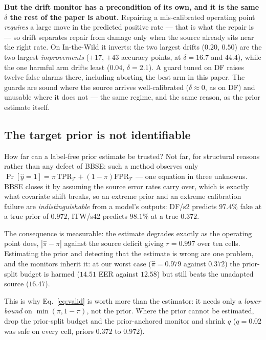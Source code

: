 \documentclass[conference]{IEEEtran}
\begin{document}
\textbf{But the drift monitor has a precondition of its own, and it is the same
$\delta$ the rest of the paper is about.} Repairing a mis-calibrated operating point \emph{requires} a large move in the
predicted positive rate --- that is what the repair is --- so drift separates
repair from damage only when the source already sits near the right rate. On
In-the-Wild it inverts: the two largest drifts ($0.20$, $0.50$) are the two
largest \emph{improvements} ($+17$, $+43$ accuracy points, at $\delta{=}16.7$ and
$44.4$), while the one harmful arm drifts least ($0.04$, $\delta{=}2.1$). A guard tuned on DF raises twelve false alarms there, including aborting the
best arm in this paper. The guards are sound where the source arrives well-calibrated
($\delta\!\approx\!0$, as on DF) and unusable where it does not --- the same
regime, and the same reason, as the prior estimate itself.

\subsection{The target prior is not identifiable}
How far can a label-free prior estimate be trusted? Not far, for structural
reasons rather than any defect of BBSE: such a method observes only
$\Pr[\hat y{=}1]=\pi\,\mathrm{TPR}_{\mathcal T}+(1{-}\pi)\mathrm{FPR}_{\mathcal T}$
--- one equation in three unknowns. BBSE closes it by assuming the source error
rates carry over, which is exactly what covariate shift breaks, so an extreme
prior and an extreme calibration failure are \emph{indistinguishable} from a
model's outputs: DF/s2 predicts $97.4\%$ fake at a true prior of $0.972$,
ITW/s42 predicts $98.1\%$ at a true $0.372$.

The consequence is measurable: the estimate degrades exactly as the operating
point does, $|\hat\pi-\pi|$ against the source deficit giving $r{=}0.997$ over ten
cells. Estimating the prior and detecting that the estimate is wrong are one problem,
and the monitors inherit it: at our worst case ($\hat\pi{=}0.979$ against $0.372$)
the prior-split budget is harmed ($14.51$ EER against $12.58$) but still beats the
unadapted source ($16.47$).

This is why Eq.~\eqref{eq:valid} is worth more than the estimator: it needs only
a \emph{lower bound} on $\min(\pi,1{-}\pi)$, not the prior. Where the prior cannot
be estimated, drop the prior-split budget and the prior-anchored monitor and
shrink $q$ ($q{=}0.02$ was safe on every cell, priors $0.372$ to $0.972$).
\end{document}

